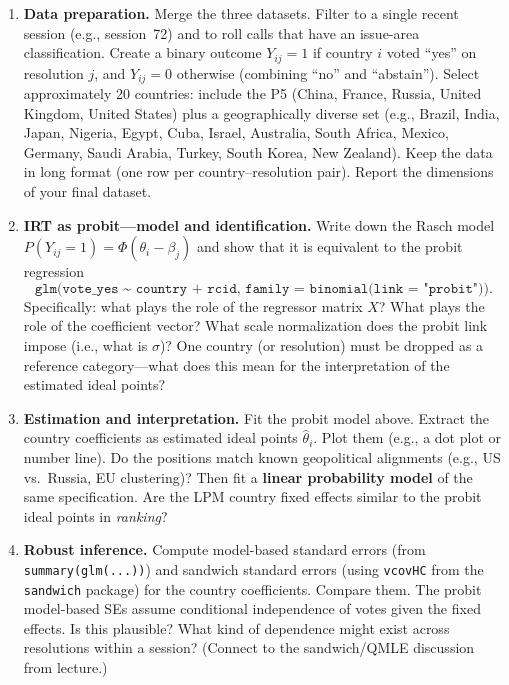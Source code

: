 \documentclass{article}
\theoremstyle{definition}
\begin{document}
\begin{enumerate}
\begin{enumerate}
  \item \textbf{Data preparation.} Merge the three datasets. Filter to a single recent session (e.g., session~72) and to roll calls that have an issue-area classification. Create a binary outcome $Y_{ij} = 1$ if country $i$ voted ``yes'' on resolution $j$, and $Y_{ij} = 0$ otherwise (combining ``no'' and ``abstain''). Select approximately 20 countries: include the P5 (China, France, Russia, United Kingdom, United States) plus a geographically diverse set (e.g., Brazil, India, Japan, Nigeria, Egypt, Cuba, Israel, Australia, South Africa, Mexico, Germany, Saudi Arabia, Turkey, South Korea, New Zealand). Keep the data in long format (one row per country--resolution pair). Report the dimensions of your final dataset.

  \item \textbf{IRT as probit---model and identification.} Write down the Rasch model $P(Y_{ij}=1)=\Phi(\theta_i - \beta_j)$ and show that it is equivalent to the probit regression
  \[
    \texttt{glm(vote\_yes \char`~ country + rcid, family = binomial(link = "probit"))}.
  \]
  Specifically: what plays the role of the regressor matrix $X$? What plays the role of the coefficient vector? What scale normalization does the probit link impose (i.e., what is $\sigma$)? One country (or resolution) must be dropped as a reference category---what does this mean for the interpretation of the estimated ideal points?

  \item \textbf{Estimation and interpretation.} Fit the probit model above. Extract the country coefficients as estimated ideal points $\hat\theta_i$. Plot them (e.g., a dot plot or number line). Do the positions match known geopolitical alignments (e.g., US vs.\ Russia, EU clustering)? Then fit a \textbf{linear probability model} of the same specification. Are the LPM country fixed effects similar to the probit ideal points in \emph{ranking}?

  \item \textbf{Robust inference.} Compute model-based standard errors (from \texttt{summary(glm(...))}) and sandwich standard errors (using \texttt{vcovHC} from the \texttt{sandwich} package) for the country coefficients. Compare them. The probit model-based SEs assume conditional independence of votes given the fixed effects. Is this plausible? What kind of dependence might exist across resolutions within a session? (Connect to the sandwich/QMLE discussion from lecture.)
\end{enumerate}


\end{enumerate}
\end{document}
